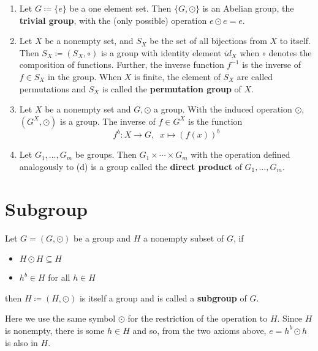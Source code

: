\begin{eg}
	\begin{enumerate}[label=(\alph*)]
		\item Let \(G \coloneqq \{e\}\) be a one element set. Then \( \{G, \odot\} \) is an Abelian group, the 
		\textbf{trivial group}, with the (only possible) operation \(e \odot e = e\). 
		\item Let \(X\) be a nonempty set, and \(S_X\) be the set of all bijections from \(X\) to itself. 
		Then \(S_X \coloneqq \left(S_X, \circ \right)\) is a group with identity element \(id_X\) when \(\circ\)
		denotes the composition of functions. Further, the inverse function \(f^{-1}\) is the inverse of \(f \in S_X\)
		in the group. When \(X\) is finite, the element of \(S_X\) are called permutations and \(S_X\) is called 
		the \textbf{permutation group} of \(X\).
		\item Let \(X\) be a nonempty set and \(G, \odot \) a group. With the induced operation \(\odot\), 
		\( \left(G^X, \odot\right)\) is a group. The inverse of \(f \in G^X\) is the function
		\[
			f^b \colon X 	\rightarrow G, \;\; x \mapsto \left(f\left(x\right)\right)^b
		\]
		\item Let \(G_1,\ldots,G_m\) be groups. Then \(G_1 \times \cdots \times G_m\) with the operation defined
		analogously to (d) is a group called the \textbf{direct product} of \(G_1,\ldots,G_m\). 
	\end{enumerate}
\end{eg}

\section{Subgroup}

\begin{definition}[Subgroup]\label{def:subgroup}
	Let \(G = \left(G, \odot\right)\) be a group and \(H\) a nonempty subset of \(G\), if
	\begin{itemize}
		\item \(H \odot H \subseteq H\)
		\item \(h^b \in H\) for all \(h \in H\)
	\end{itemize}
	then \(H \coloneqq \left(H, \odot\right)\) is itself a group and is called a \textbf{subgroup} of \(G\).
\end{definition}

\begin{remark}
	Here we use the same symbol \(\odot\) for the restriction of the operation to \(H\). Since
	\(H\) is nonempty, there is some \(h \in H\) and so, from the two axioms above,
	\(e = h^b \odot h\) is also in \(H\).
\end{remark}

